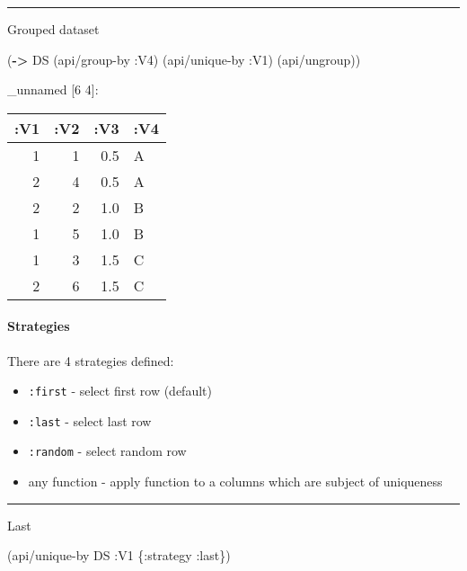 \documentclass[]{article}
\newenvironment{Shaded}{\begin{snugshade}}{\end{snugshade}}
\newcommand{\KeywordTok}[1]{\textcolor[rgb]{0.13,0.29,0.53}{\textbf{#1}}}
\newcommand{\AttributeTok}[1]{\textcolor[rgb]{0.77,0.63,0.00}{#1}}
\newcommand{\NormalTok}[1]{#1}
\providecommand{\tightlist}{%
  \setlength{\itemsep}{0pt}\setlength{\parskip}{0pt}}
\let\oldparagraph\paragraph
\renewcommand{\paragraph}[1]{\oldparagraph{#1}\mbox{}}
\begin{document}
\begin{center}\rule{0.5\linewidth}{0.5pt}\end{center}

Grouped dataset

\begin{Shaded}
\begin{Highlighting}[]
\NormalTok{(}\KeywordTok{->}\NormalTok{ DS}
\NormalTok{    (api/group-by }\AttributeTok{:V4}\NormalTok{)}
\NormalTok{    (api/unique-by }\AttributeTok{:V1}\NormalTok{)}
\NormalTok{    (api/ungroup))}
\end{Highlighting}
\end{Shaded}

\_unnamed {[}6 4{]}:

\begin{longtable}[]{@{}rrrl@{}}
\toprule
:V1 & :V2 & :V3 & :V4\tabularnewline
\midrule
\endhead
1 & 1 & 0.5 & A\tabularnewline
2 & 4 & 0.5 & A\tabularnewline
2 & 2 & 1.0 & B\tabularnewline
1 & 5 & 1.0 & B\tabularnewline
1 & 3 & 1.5 & C\tabularnewline
2 & 6 & 1.5 & C\tabularnewline
\bottomrule
\end{longtable}

\paragraph{Strategies}\label{strategies}

There are 4 strategies defined:

\begin{itemize}
\tightlist
\item
  \texttt{:first} - select first row (default)
\item
  \texttt{:last} - select last row
\item
  \texttt{:random} - select random row
\item
  any function - apply function to a columns which are subject of
  uniqueness
\end{itemize}

\begin{center}\rule{0.5\linewidth}{0.5pt}\end{center}

Last

\begin{Shaded}
\begin{Highlighting}[]
\NormalTok{(api/unique-by DS }\AttributeTok{:V1}\NormalTok{ \{}\AttributeTok{:strategy} \AttributeTok{:last}\NormalTok{\})}
\end{Highlighting}
\end{Shaded}
\end{document}
